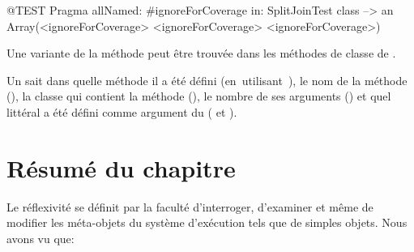 \documentclass[a4paper,10pt,twoside]{book}
\begin{document}
{\begin{code}{@TEST}
Pragma allNamed: #ignoreForCoverage in: SplitJoinTest class  --> an Array(<ignoreForCoverage> <ignoreForCoverage> <ignoreForCoverage>)
\end{code}

Une variante de la méthode  peut être trouvée dans les méthodes de classe de .

Un \pragma sait dans quelle méthode il a été défini \mbox{(en utilisant )}, le nom de la méthode (), la classe qui contient la méthode \mbox{()}, le nombre de ses arguments () et quel littéral a été défini comme argument du \pragma ( et ).


\section{Résumé du chapitre}

Le réflexivité se définit par la faculté d'interroger, d'examiner et même de modifier les méta-objets du système d'exécution tels que de simples objets. Nous avons vu que:

}
\end{document}
